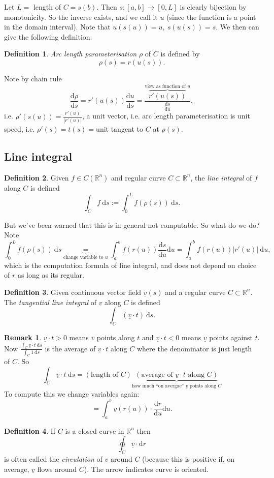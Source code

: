 \documentclass[a4paper]{article}
\theoremstyle{definition}
\newtheorem{defn}{Definition}[subsection]
\newtheorem*{remark}{Remark}
\begin{document}
Let $L=$ length of $C=s(b)$. Then $s:[a,b]\rightarrow [0,L]$ is clearly bijection by monotonicity. So the inverse exists, and we call it $u$ (since the function is a point in the domain interval). Note that $u(s(u))=u,\ s(u(s))=s.$ We then can give the following definition:
\begin{defn}
\textit{Arc length parameterisation} $\rho$ of $C$ is defined by
\[
\rho (s) = r(u(s)).
\]
\end{defn}
Note by chain rule
\[
\frac{\mathrm d \rho}{\mathrm d s} = r'(u(s)) \frac{\mathrm d u}{\mathrm d s} = \frac{\overbrace{r'(u(s))}^{\text{view as function of }u}}{\frac{\mathrm d s}{\mathrm d u}},
\]
i.e. $\rho'(s(u))=\frac{r'(u)}{|r'(u)|}$, a unit vector, i.e. arc length parameterisation is unit speed, i.e. $\rho'(s)=t(s)=$unit tangent to $C$ at $\rho(s)$.
\subsection{Line integral}
\begin{defn}
Given $f\in C(\mathbb R^n)$ and regular curve $C\subset \mathbb R^n$, the \textit{line integral} of $f$ along $C$ is defined
\[
\int_C f \ \mathrm d s := \int_0^L f(\rho(s)) \ \mathrm d s.
\]
\end{defn}
But we've been warned that this is in general not computable. So what do we do? Note
\[
\int_0^L f(\rho(s)) \ \mathrm d s \underbrace{=}_{\text{change variable to }u} \int_a^b f(r(u)) \frac{\mathrm d s}{\mathrm d u} \mathrm d u = \int_a^b f(r(u)) |r'(u)| \ \mathrm d u,
\]
which is the computation formula of line integral, and does not depend on choice of $r$ as long as its regular.

\begin{defn}
Given continuous vector field $\underline v(s)$ and a regular curve $C\subset \mathbb R^n$. The \textit{tangential line integral} of $\underline v$ along $C$ is defined
\[
\int_C (\underline v\cdot t)\ \mathrm d s.
\]
\end{defn}
\begin{remark}
$\underline v\cdot t>0$ means $v$ points along $t$ and $\underline v\cdot t<0$ means $\underline v$ points against $t$. Now $\displaystyle \frac{\int_C \underline v \cdot t \ \mathrm d s}{\int_C 1 \ \mathrm d s}$ is the average of $\underline v\cdot t$ along $C$ where the denominator is just length of $C$. So
\[
\int_C \underline v \cdot t \ \mathrm d s= (\text{length of } C) \underbrace{(\text{average of }\underline v\cdot t \text{ along }C)}_{\text{how much ``on avergae'' }\underline v\text{ points along }C}
\]
To compute this we change variables again:
\[
=\int_a^b \underline v(r(u)) \cdot \frac{\mathrm d r}{\mathrm d u} \mathrm d u.
\]
\end{remark}
\begin{defn}
If $C$ is a closed curve in $\mathbb R^n$ then
\[
\ointctrclockwise_C \underline v \cdot \mathrm d r
\]
is often called the \textit{circulation} of $\underline v$ around $C$ (because this is positive if, on average, $\underline v$ flows around $C$). The arrow indicates curve is oriented.
\end{defn}
\end{document}
